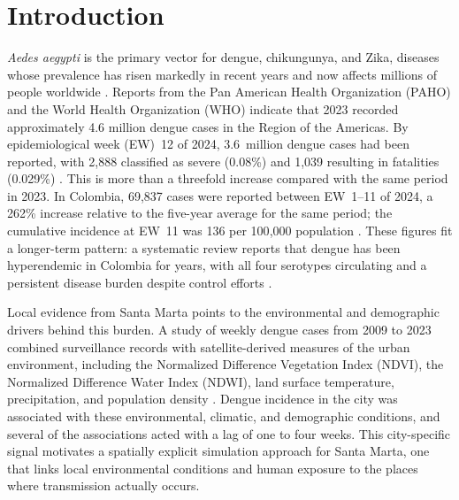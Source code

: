 \documentclass[applsci,article,accept,pdftex,moreauthors]{Definitions/mdpi}
\begin{document}

\section{Introduction}

\textit{Aedes aegypti} is the primary vector for dengue, chikungunya, and Zika, diseases whose prevalence has risen markedly in recent years and now affects millions of people worldwide \cite{melo2024integrated}. Reports from the Pan American Health Organization (PAHO) and the World Health Organization (WHO) indicate that 2023 recorded approximately 4.6 million dengue cases in the Region of the Americas. By epidemiological week (EW)~12 of 2024, 3.6~million dengue cases had been reported, with 2{,}888 classified as severe (0.08\%) and 1{,}039 resulting in fatalities (0.029\%) \cite{ops2024}. This is more than a threefold increase compared with the same period in 2023. In Colombia, 69{,}837 cases were reported between EW~1--11 of 2024, a 262\% increase relative to the five-year average for the same period; the cumulative incidence at EW~11 was 136 per 100{,}000 population \cite{ops2024}. These figures fit a longer-term pattern: a systematic review reports that dengue has been hyperendemic in Colombia for years, with all four serotypes circulating and a persistent disease burden despite control efforts \cite{RodriguezMorales2024DengueColombia}.

Local evidence from Santa Marta points to the environmental and demographic drivers behind this burden. A study of weekly dengue cases from 2009 to 2023 combined surveillance records with satellite-derived measures of the urban environment, including the Normalized Difference Vegetation Index (NDVI), the Normalized Difference Water Index (NDWI), land surface temperature, precipitation, and population density \cite{MARTIN2026100164}. Dengue incidence in the city was associated with these environmental, climatic, and demographic conditions, and several of the associations acted with a lag of one to four weeks. This city-specific signal motivates a spatially explicit simulation approach for Santa Marta, one that links local environmental conditions and human exposure to the places where transmission actually occurs.
\end{document}
